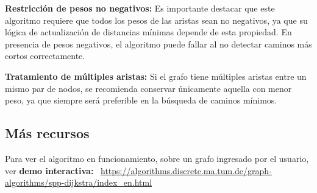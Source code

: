 \textbf{ Restricción de pesos no negativos:} Es importante destacar que este algoritmo requiere que todos los pesos de las aristas sean no negativos, ya que su lógica de actualización de distancias mínimas depende de esta propiedad. En presencia de pesos negativos, el algoritmo puede fallar al no detectar caminos más cortos correctamente. 

\textbf{Tratamiento de múltiples aristas:} Si el grafo tiene múltiples aristas entre un mismo par de nodos, se recomienda conservar únicamente aquella con menor peso, ya que siempre será preferible en la búsqueda de caminos mínimos. 





\subsection*{Más recursos}
    
Para ver el algoritmo en funcionamiento, sobre un grafo ingresado por el usuario, ver \textbf{demo interactiva:} \
\url{https://algorithms.discrete.ma.tum.de/graph-algorithms/spp-dijkstra/index_en.html}